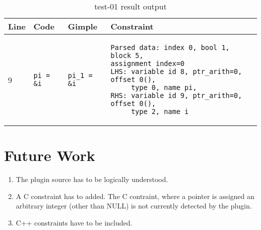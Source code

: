 \begin{table}
    \begin{center}
        \begin{tabular}{| m{1cm} | m{2cm} | m{2cm} | m{8cm} |}
            \hline
            \textbf{Line} & \textbf{Code} & \textbf{Gimple} & \textbf{Constraint} \\
            \hline
            \hline
            9 & \verb+pi = &i+ & \verb+pi_1 = &i+ & 
\begin{verbatim}
Parsed data: index 0, bool 1, block 5,
assignment index=0 
LHS: variable id 8, ptr_arith=0, offset 0(), 
     type 0, name pi,
RHS: variable id 9, ptr_arith=0, offset 0(), 
     type 2, name i
\end{verbatim}
\\
            \hline
        \end{tabular}
\label{table:test-01-constr}
\caption{test-01 result output}
    \end{center}
\end{table}



\section{Future Work}\label{sec:future-work}
\begin{enumerate}
    \item The plugin source has to be logically understood.
    \item A C constraint has to added. The C contraint, where a pointer is assigned an arbitrary integer (other than NULL) is not currently detected by the plugin.
    \item C++ constraints have to be included.
\end{enumerate}
